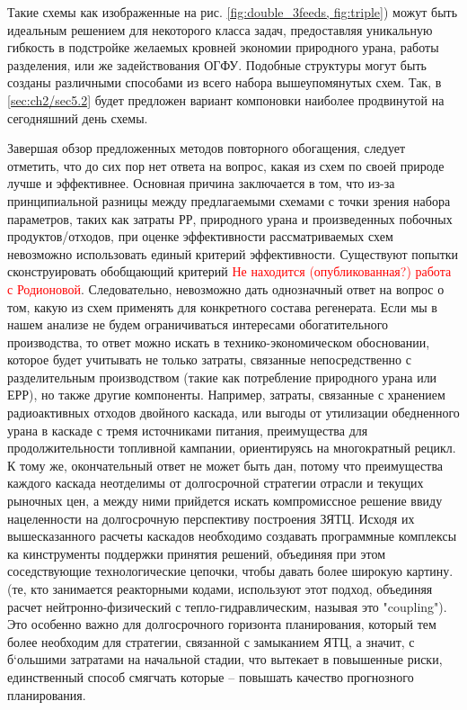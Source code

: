 Такие схемы как изображенные на рис. \ref{fig:double_3feeds, fig:triple}) можут быть идеальным решением для некоторого класса задач, предоставляя уникальную гибкость в подстройке желаемых кровней экономии природного урана, работы разделения, или же задействования ОГФУ. Подобные структуры могут быть созданы различными способами из всего набора вышеупомянутых схем. Так, в \ref{sec:ch2/sec5.2} будет предложен вариант компоновки наиболее продвинутой на сегодняшний день схемы.

Завершая обзор предложенных методов повторного обогащения, следует отметить, что до сих пор нет ответа на вопрос, какая из схем по своей природе лучше и эффективнее. Основная причина заключается в том, что из-за принципиальной разницы между предлагаемыми схемами с точки зрения набора параметров, таких как затраты РР, природного урана и произведенных побочных продуктов/отходов, при оценке эффективности рассматриваемых схем невозможно использовать единый критерий эффективности. Существуют попытки сконструировать обобщающий критерий \textcolor{red}{Не находится (опубликованная?) работа с Родионовой}. Следовательно, невозможно дать однозначный ответ на вопрос о том, какую из схем применять для конкретного состава регенерата. Если мы в нашем анализе не будем ограничиваться интересами обогатительного производства, то ответ можно искать в технико-экономическом обосновании, которое будет учитывать не только затраты, связанные непосредственно с разделительным производством (такие как потребление природного урана или ЕРР), но также другие компоненты. Например, затраты, связанные с хранением радиоактивных отходов двойного каскада, или выгоды от утилизации обедненного урана в каскаде с тремя источниками питания, преимущества для продолжительности топливной кампании, ориентируясь на многократный рецикл. К тому же, окончательный ответ не может быть дан, потому что преимущества каждого каскада неотделимы от долгосрочной стратегии отрасли и текущих рыночных цен, а между ними прийдется искать компромиссное решение ввиду нацеленности на долгосрочную перспективу построения ЗЯТЦ. Исходя их вышесказанного расчеты каскадов необходимо создавать программные комплексы ка кинструменты поддержки принятия решений, объединяя при этом соседствующие технологические цепочки, чтобы давать более широкую картину. (те, кто занимается реакторными кодами, используют этот подход, объединяя расчет нейтронно-физический с тепло-гидравлическим, называя это "coupling").  Это особенно важно для долгосрочного горизонта планирования, который тем более необходим для стратегии, связанной с замыканием ЯТЦ, а значит, с б`ольшими затратами на начальной стадии, что вытекает в повышенные риски, единственный способ смягчать которые -- повышать качество прогнозного планирования.


